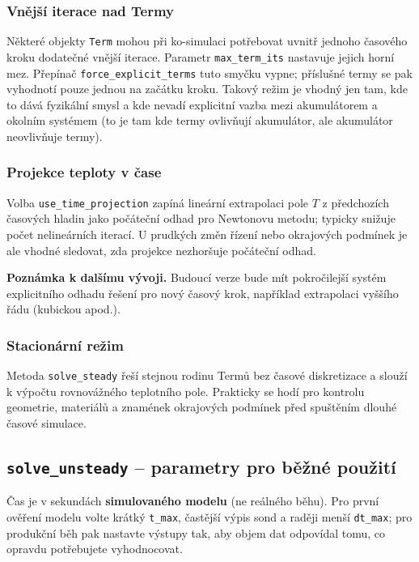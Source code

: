 \documentclass[a4paper,11pt]{article}
\begin{document}
\subsubsection*{Vnější iterace nad Termy}
Některé objekty \texttt{Term} mohou při ko-simulaci potřebovat uvnitř jednoho
časového kroku dodatečné vnější iterace. Parametr \texttt{max\_term\_its}
nastavuje jejich horní mez. Přepínač \texttt{force\_explicit\_terms} tuto smyčku
vypne; příslušné termy se pak vyhodnotí pouze jednou na začátku kroku. Takový
režim je vhodný jen tam, kde to dává fyzikální smysl a kde nevadí explicitní
vazba mezi akumulátorem a okolním systémem (to je tam kde termy ovlivňují 
akumulátor, ale akumulátor neovlivňuje termy).

\subsubsection*{Projekce teploty v čase}
Volba \texttt{use\_time\_projection} zapíná lineární extrapolaci pole \(T\) z
předchozích časových hladin jako počáteční odhad pro Newtonovu metodu; typicky
snižuje počet nelineárních iterací. U prudkých změn řízení nebo okrajových
podmínek je ale vhodné sledovat, zda projekce nezhoršuje počáteční odhad.

\begin{noteblock}
\textbf{Poznámka k dalšímu vývoji.}
Budoucí verze bude mít pokročilejší systém explicitního odhadu řešení pro nový
časový krok, například extrapolaci vyššího řádu (kubickou apod.).
\end{noteblock}

\subsubsection*{Stacionární režim}
Metoda \texttt{solve\_steady} řeší stejnou rodinu Termů bez časové diskretizace
a slouží k výpočtu rovnovážného teplotního pole. Prakticky se hodí pro kontrolu
geometrie, materiálů a znamének okrajových podmínek před spuštěním dlouhé
časové simulace.

\subsection*{\texttt{solve\_unsteady} -- parametry pro běžné použití}
\label{pars:solve-unsteady}

Čas je v sekundách \textbf{simulovaného modelu} (ne reálného běhu). Pro první
ověření modelu volte krátký \texttt{t\_max}, častější výpis sond a raději
menší \texttt{dt\_max}; pro produkční běh pak nastavte výstupy tak, aby objem
dat odpovídal tomu, co opravdu potřebujete vyhodnocovat.
\end{document}
